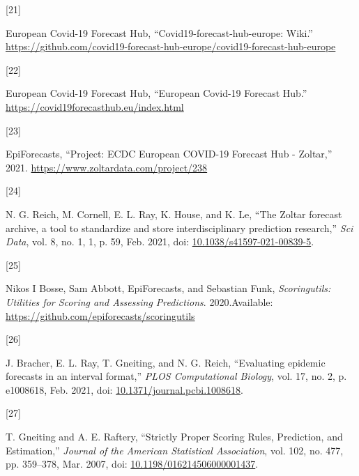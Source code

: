 \documentclass[
]{article}
\newlength{\cslhangindent}
\newlength{\csllabelwidth}
\newlength{\cslentryspacingunit} %
\newenvironment{CSLReferences}[2] %
 {%
  \setlength{\parindent}{0pt}
  \ifodd #1
  \let\oldpar\par
  \def\par{\hangindent=\cslhangindent\oldpar}
  \fi
  \setlength{\parskip}{#2\cslentryspacingunit}
 }%
 {}
\newcommand{\CSLLeftMargin}[1]{\parbox[t]{\csllabelwidth}{#1}}
\newcommand{\CSLRightInline}[1]{\parbox[t]{\linewidth - \csllabelwidth}{#1}\break}
\begin{document}
\begin{CSLReferences}{0}{0}
\leavevmode{}%
\CSLLeftMargin{{[}21{]} }
\CSLRightInline{European Covid-19 Forecast Hub,
{``Covid19-forecast-hub-europe: {Wiki}.''}
\url{https://github.com/covid19-forecast-hub-europe/covid19-forecast-hub-europe}}

\leavevmode{}%
\CSLLeftMargin{{[}22{]} }
\CSLRightInline{European Covid-19 Forecast Hub, {``European {Covid-19
Forecast Hub}.''} \url{https://covid19forecasthub.eu/index.html}}

\leavevmode{}%
\CSLLeftMargin{{[}23{]} }
\CSLRightInline{EpiForecasts, {``Project: {ECDC European COVID-19
Forecast Hub} - {Zoltar},''} 2021.
\url{https://www.zoltardata.com/project/238}}

\leavevmode{}%
\CSLLeftMargin{{[}24{]} }
\CSLRightInline{N. G. Reich, M. Cornell, E. L. Ray, K. House, and K. Le,
{``The {Zoltar} forecast archive, a tool to standardize and store
interdisciplinary prediction research,''} \emph{Sci Data}, vol. 8, no.
1, 1, p. 59, Feb. 2021, doi:
\href{https://doi.org/10.1038/s41597-021-00839-5}{10.1038/s41597-021-00839-5}.}

\leavevmode{}%
\CSLLeftMargin{{[}25{]} }
\CSLRightInline{Nikos I Bosse, Sam Abbott, EpiForecasts, and Sebastian
Funk, \emph{Scoringutils: {Utilities} for {Scoring} and {Assessing
Predictions}}. 2020.Available:
\url{https://github.com/epiforecasts/scoringutils}}

\leavevmode{}%
\CSLLeftMargin{{[}26{]} }
\CSLRightInline{J. Bracher, E. L. Ray, T. Gneiting, and N. G. Reich,
{``Evaluating epidemic forecasts in an interval format,''} \emph{PLOS
Computational Biology}, vol. 17, no. 2, p. e1008618, Feb. 2021, doi:
\href{https://doi.org/10.1371/journal.pcbi.1008618}{10.1371/journal.pcbi.1008618}.}

\leavevmode{}%
\CSLLeftMargin{{[}27{]} }
\CSLRightInline{T. Gneiting and A. E. Raftery, {``Strictly {Proper
Scoring Rules}, {Prediction}, and {Estimation},''} \emph{Journal of the
American Statistical Association}, vol. 102, no. 477, pp. 359--378, Mar.
2007, doi:
\href{https://doi.org/10.1198/016214506000001437}{10.1198/016214506000001437}.}


\end{CSLReferences}
\end{document}
